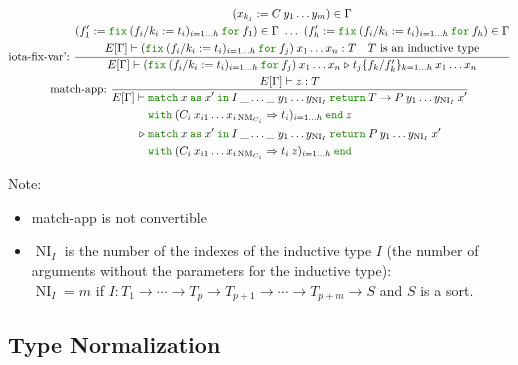 \documentclass[a4paper,fleqn]{article}
\newcommand{\kwin}{\mbox{\color{mygreen}\ttfamily in}}
\newcommand{\kwmatch}{\mbox{\color{mygreen}\ttfamily match}}
\newcommand{\kwas}{\mbox{\color{mygreen}\ttfamily as}}
\newcommand{\kwreturn}{\mbox{\color{mygreen}\ttfamily return}}
\newcommand{\kwwith}{\mbox{\color{mygreen}\ttfamily with}}
\newcommand{\kwend}{\mbox{\color{mygreen}\ttfamily end}}
\newcommand{\kwfix}{\mbox{\color{mygreen}\ttfamily fix}}
\newcommand{\kwfor}{\mbox{\color{mygreen}\ttfamily for}}
\newcommand{\fix}[4]{\kwfix\:(#1 := #2)_{#3}\:\kwfor\:#4}
\DeclareMathOperator{\NI}{NI} %
\DeclareMathOperator{\NM}{NM} %
\newcommand{\subst}[3]{#1\{#2/#3\}}
\newcommand{\reltri}{\mathrel{\triangleright}}
\begin{document}
\begin{gather*}
  \text{iota-fix-var':}~
    \dfrac
    {
      \begin{gathered}
        (x_{k_j} := C\:y_1\ldots y_m) \in \Gamma \\
        (f'_1 := \fix{f_i/k_i}{t_i}{i=1\ldots h}{f_1}) \in \Gamma ~\ldots~
        (f'_h := \fix{f_i/k_i}{t_i}{i=1\ldots h}{f_h}) \in \Gamma \\
        E[\Gamma] \vdash (\fix{f_i/k_i}{t_i}{i=1\ldots h}{f_j})\:x_1\ldots x_n : T \quad
        \text{$T$ is an inductive type}
      \end{gathered}
    }{
      E[\Gamma] \vdash
      (\fix{f_i/k_i}{t_i}{i=1\ldots h}{f_j})\:x_1\ldots x_n
      \reltri
      \subst{t_j}{f_k}{f'_k}_{k=1\ldots h} \:x_1 \ldots x_n
    } \\
  \text{match-app:}~
    \dfrac
    {
      E[\Gamma] \vdash z : T
    }{
      \begin{aligned}
        E[\Gamma] \vdash\; &
          \kwmatch\:x\:
          \kwas\:x'\:
          \kwin\:I\:\_\ldots \_\;y_1\ldots y_{\NI_I}\:
          \kwreturn\:{T \rightarrow P\:y_1\ldots y_{\NI_I}\:x'}\\
          & \kwwith\:({C_i\: x_{i1}\ldots x_{i\NM_{C_i}}} \Rightarrow {t_i})_{i=1\ldots h}\:
          \kwend\:z \\
        \reltri\; &
          \kwmatch\:x\:
          \kwas\:x'\:
          \kwin\:I\:\_\ldots \_\;y_1\ldots y_{\NI_I}\:
          \kwreturn\:{P\:y_1\ldots y_{\NI_I}\:x'}\\
          & \kwwith\:({C_i\: x_{i1}\ldots x_{i\NM_{C_i}}} \Rightarrow {t_i\:z})_{i=1\ldots h}\:
          \kwend
      \end{aligned}
    }
\end{gather*}

{\small Note:
\begin{itemize}
  \item match-app is not convertible
  \item $\NI_I$ is the number of the indexes of the inductive type $I$ (the number of arguments without the parameters for the inductive type): \\
    $\NI_I=m$ if $I : T_1 \rightarrow \dotsb \rightarrow T_p \rightarrow T_{p+1} \rightarrow \dotsb \rightarrow T_{p+m} \rightarrow S$ and $S$ is a sort.
\end{itemize}}

\subsection{Type Normalization}\label{sec:type-normalization}
\end{document}
